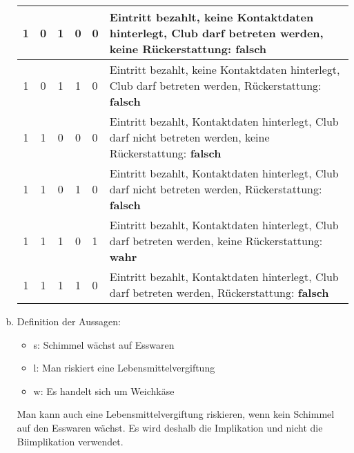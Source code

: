\documentclass[12pt,a4paper]{article}
\begin{document}
\begin{enumerate}[a)]
\begin{tabular}{c|c|c|c|p{}|p{}}
\hline
1 & 0 & 1 & 0 & 0 & Eintritt bezahlt, keine Kontaktdaten hinterlegt, Club darf betreten werden, keine Rückerstattung: \textbf{falsch}\\
\hline
1 & 0 & 1 & 1 & 0 & Eintritt bezahlt, keine Kontaktdaten hinterlegt, Club darf betreten werden, Rückerstattung: \textbf{falsch}\\
\hline
1 & 1 & 0 & 0 & 0 & Eintritt bezahlt, Kontaktdaten hinterlegt, Club darf nicht betreten werden, keine Rückerstattung: \textbf{falsch}\\
\hline
1 & 1 & 0 & 1 &  0 & Eintritt bezahlt, Kontaktdaten hinterlegt, Club darf nicht betreten werden, Rückerstattung: \textbf{falsch}\\
\hline
1 & 1 & 1 & 0 & 1 & Eintritt bezahlt, Kontaktdaten hinterlegt, Club darf betreten werden, keine Rückerstattung: \textbf{wahr}\\
\hline
1 & 1 & 1  & 1 & 0 & Eintritt bezahlt, Kontaktdaten hinterlegt, Club darf betreten werden, Rückerstattung: \textbf{falsch}\\
\end{tabular}

\item Definition der Aussagen:
\begin{itemize}
\item s: Schimmel wächst auf Esswaren
\item l: Man riskiert eine Lebensmittelvergiftung
\item w: Es handelt sich um Weichkäse
\end{itemize}
Man kann auch eine Lebensmittelvergiftung riskieren, wenn kein Schimmel auf den Esswaren wächst. Es wird deshalb die Implikation und nicht die Biimplikation verwendet.



\end{enumerate}
\end{document}
